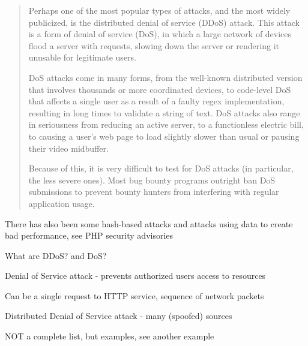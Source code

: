 \documentclass[Screen16to9,17pt]{foils}
\begin{document}
\begin{quote}
Perhaps one of the most popular types of attacks, and the most widely publicized, is the distributed denial of service (DDoS) attack. This attack is a form of denial of service (DoS), in which a large network of devices flood a server with requests, slowing down the server or rendering it unusable for legitimate users.

DoS attacks come in many forms, from the well-known distributed version that involves thousands or more coordinated devices, to code-level DoS that affects a single user as a result of a faulty regex implementation, resulting in long times to validate a string of text. DoS attacks also range in seriousness from reducing an active server, to a functionless electric bill, to causing a user’s web page to load slightly slower than usual or pausing their video midbuffer.

Because of this, it is very difficult to test for DoS attacks (in particular, the less severe
ones). Most bug bounty programs outright ban DoS submissions to prevent bounty
hunters from interfering with regular application usage.
\end{quote}

\begin{list2}
\item There has also been some hash-based attacks and attacks using data to create bad performance, see PHP security advisories
\end{list2}



\begin{list1}
\item What are DDoS? and DoS?
\item Denial of Service attack - prevents authorized users access to resources
\item Can be a single request to HTTP service, sequence of network packets
\item Distributed Denial of Service attack - many (spoofed) sources
\item {}
\end{list1}



NOT a complete list, but examples, see another example\\
\end{document}
